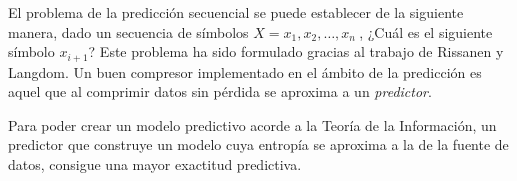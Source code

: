 El problema de la predicción secuencial se puede establecer de la siguiente manera, dado un secuencia de símbolos $ X = x_{1}, x_{2}, \dots, x_{n}\ $, ¿Cuál es el siguiente símbolo $x_{i+1}$? Este problema ha sido formulado gracias al trabajo de  Rissanen\cite{Rissanen1983} y Langdom\cite{Langdon1983}. Un buen compresor implementado en el ámbito de la predicción es aquel que al comprimir datos sin pérdida se aproxima a un \emph{predictor}.

 













Para poder crear un modelo predictivo acorde a la Teoría de la Información, un predictor que construye un modelo cuya entropía se aproxima a la de la fuente de datos, consigue una mayor exactitud predictiva. 


